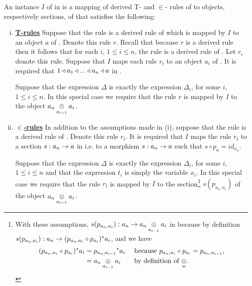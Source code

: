 

\begin{definition}
An instance $I$ of \gatUw in \catcw is a  mapping 
of derived T- and $\in$- rules of \gatUw to objects, respectively sections, of \gatUw that satisfies the following:
\begin{enumerate}[(i)]
\setlength\itemindent{2cm}
\item \underline{\textbf{T-rules}} 
Suppose that  the rule
 is a derived rule of \gatUw which is mapped by $I$ to an object $a$ of \catc. Denote this rule $r$. Recall that because $r$ is a derived rule then it follows  that for each $i$, 
$1 \leq i \leq n$, the rule  is a derived rule of \gatU. Let $r_i$ denote this rule.
Suppose that $I$ maps each rule $r_i$ to an object $a_i$ of \catcw.
It is required that $1 \base a_1 \base ... \base a_n \base a$ in \catc.

Suppose that the  expression $\Delta$ is exactly the expression $\Delta_i$, for some $i$, $1 \leq i \leq n$. In this special case we require that the rule $r$  is mapped by $I$ to the object 
$\crossx{a_n}{a_i}{a_{i-1}}$. 

\item \underline{\textbf{$\boldsymbol {\in}$-rules}} 
In addition to the assumptions made in (i),  suppose that the rule
 is a  derived rule of \gatU. 
Denote this rule $r_t$. It is required that $I$ maps the rule $r_t$ to a section
 $s:a_n \morph a$ in \catcw i.e. to a morphism $s:a_n \morph a$ such that $s \circ p_a = id_{a_n}$. 

Suppose that the  expression $\Delta$ is exactly the expression $\Delta_i$, for some $i$, $1 \leq i \leq n$ and that the expression $t_i$ is simply the variable $x_i$. 
In this special case we require that the rule $r_t$  is mapped by $I$ to the section\footnote{
With these assumptions, $s(p_{a_n,a_i}): a_n \morph \crossx{a_n}{a_i}{a_{i-1}}$ in \catcw because by definition  $s(p_{a_n,a_i}): a_n  \morph (p_{a_n,a_i} \circ p_{a_i})^*a_i$,
and we have 
\begin{align*}
(p_{a_n,a_i} \circ p_{a_i})^*a_i &= {p_{a_n,a_{i-1}}} ^* a_i  && \mbox{ because $p_{a_n,a_i} \circ p_{a_i}=p_{a_n,a_{i-1}}$,} \\
                                 &= \crossx{a_n}{a_i}{a_{i-1}} && \mbox{ by definition of $\crossx{}{}{w}$}.
\end{align*}
} %
$s(p_{a_n,a_i})$ of the object $\crossx{a_n}{a_i}{a_{i-1}}$. 


\end{enumerate}
\end{definition}
